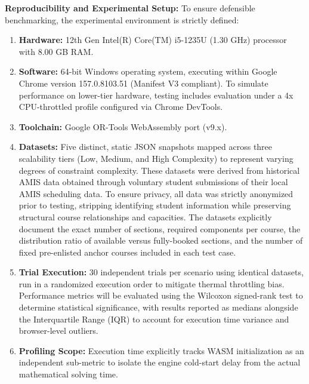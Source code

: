 \documentclass{icsthesis}
\begin{document}
\begin{mainmatter}
		\textbf{Reproducibility and Experimental Setup:}
		To ensure defensible benchmarking, the experimental environment is strictly defined:
		\begin{enumerate}
			\item \textbf{Hardware:} 12th Gen Intel(R) Core(TM) i5-1235U (1.30 GHz) processor with 8.00 GB RAM.
			\item \textbf{Software:} 64-bit Windows operating system, executing within Google Chrome version 157.0.8103.51 (Manifest V3 compliant). To simulate performance on lower-tier hardware, testing includes evaluation under a 4x CPU-throttled profile configured via Chrome DevTools.
			\item \textbf{Toolchain:} Google OR-Tools WebAssembly port (v9.x).
			\item \textbf{Datasets:} Five distinct, static JSON snapshots mapped across three scalability tiers (Low, Medium, and High Complexity) to represent varying degrees of constraint complexity. These datasets were derived from historical AMIS data obtained through voluntary student submissions of their local AMIS scheduling data. To ensure privacy, all data was strictly anonymized prior to testing, stripping identifying student information while preserving structural course relationships and capacities. The datasets explicitly document the exact number of sections, required components per course, the distribution ratio of available versus fully-booked sections, and the number of fixed pre-enlisted anchor courses included in each test case.
			\item \textbf{Trial Execution:} 30 independent trials per scenario using identical datasets, run in a randomized execution order to mitigate thermal throttling bias. Performance metrics will be evaluated using the Wilcoxon signed-rank test to determine statistical significance, with results reported as medians alongside the Interquartile Range (IQR) to account for execution time variance and browser-level outliers.
			\item \textbf{Profiling Scope:} Execution time explicitly tracks WASM initialization as an independent sub-metric to isolate the engine cold-start delay from the actual mathematical solving time.
		\end{enumerate}
		

\end{mainmatter}
\end{document}
